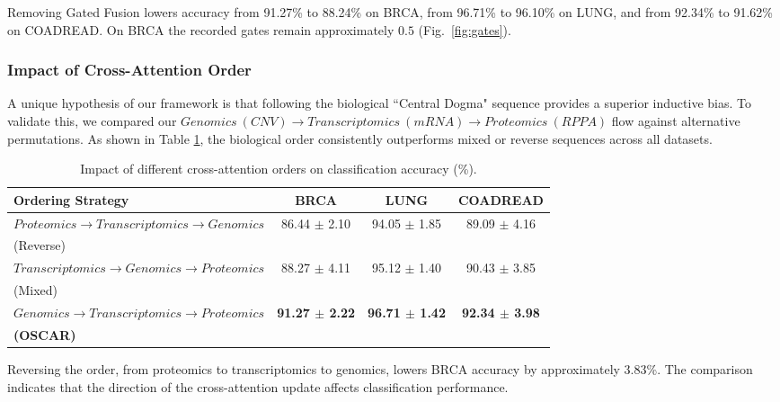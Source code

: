\documentclass[lettersize,journal]{IEEEtran}
\begin{document}
Removing Gated Fusion lowers accuracy from 91.27\% to 88.24\% on BRCA, from 96.71\% to 96.10\% on LUNG, and from 92.34\% to 91.62\% on COADREAD. On BRCA the recorded gates remain approximately $0.5$ (Fig.~\ref{fig:gates}).

\subsubsection{Impact of Cross-Attention Order}
A unique hypothesis of our framework is that following the biological ``Central Dogma" sequence provides a superior inductive bias. To validate this, we compared our $Genomics\ (CNV) \rightarrow Transcriptomics\ (mRNA) \rightarrow Proteomics\ (RPPA)$ flow against alternative permutations. As shown in Table \ref{tab:ablation_order}, the biological order consistently outperforms mixed or reverse sequences across all datasets.

\begin{table}[!htbp]
\centering
\small
\caption{Impact of different cross-attention orders on classification accuracy (\%).}
\label{tab:ablation_order}
\begin{tabular}{lccc}
\hline

\textbf{Ordering Strategy} & \textbf{BRCA} & \textbf{LUNG} & \textbf{COADREAD} \\ \hline
$Proteomics \rightarrow Transcriptomics \rightarrow Genomics$ & 86.44 $\pm$ 2.10 & 94.05 $\pm$ 1.85 & 89.09 $\pm$ 4.16 \\
(Reverse) \\
$Transcriptomics \rightarrow Genomics \rightarrow Proteomics $ & 88.27 $\pm$ 4.11 & 95.12 $\pm$ 1.40 & 90.43 $\pm$ 3.85 \\
(Mixed) \\
\textbf{$ Genomics \rightarrow Transcriptomics \rightarrow Proteomics $} & \textbf{91.27 $\pm$ 2.22} & \textbf{96.71 $\pm$ 1.42} & \textbf{92.34 $\pm$ 3.98} \\ 
\textbf{(OSCAR)}\\ 

\hline
\end{tabular}
\end{table}


Reversing the order, from proteomics to transcriptomics to genomics, lowers BRCA accuracy by approximately 3.83\%. The comparison indicates that the direction of the cross-attention update affects classification performance.

\end{document}
